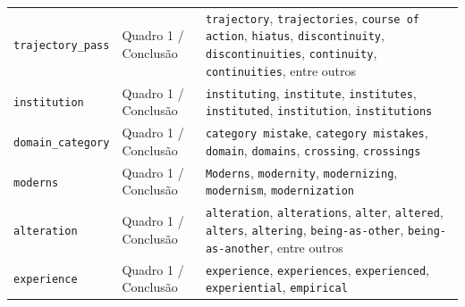 \begin{longtable}{@{}p{} p{} p{}@{}}
\texttt{trajectory\_pass} & Quadro 1 / Conclusão & \texttt{trajectory}, \texttt{trajectories}, \texttt{course of action}, \texttt{hiatus}, \texttt{discontinuity}, \texttt{discontinuities}, \texttt{continuity}, \texttt{continuities}, entre outros \\
\texttt{institution} & Quadro 1 / Conclusão & \texttt{instituting}, \texttt{institute}, \texttt{institutes}, \texttt{instituted}, \texttt{institution}, \texttt{institutions} \\
\texttt{domain\_category} & Quadro 1 / Conclusão & \texttt{category mistake}, \texttt{category mistakes}, \texttt{domain}, \texttt{domains}, \texttt{crossing}, \texttt{crossings} \\
\texttt{moderns} & Quadro 1 / Conclusão & \texttt{Moderns}, \texttt{modernity}, \texttt{modernizing}, \texttt{modernism}, \texttt{modernization} \\
\texttt{alteration} & Quadro 1 / Conclusão & \texttt{alteration}, \texttt{alterations}, \texttt{alter}, \texttt{altered}, \texttt{alters}, \texttt{altering}, \texttt{being-as-other}, \texttt{being-as-another}, entre outros \\
\texttt{experience} & Quadro 1 / Conclusão & \texttt{experience}, \texttt{experiences}, \texttt{experienced}, \texttt{experiential}, \texttt{empirical} \\
\end{longtable}

